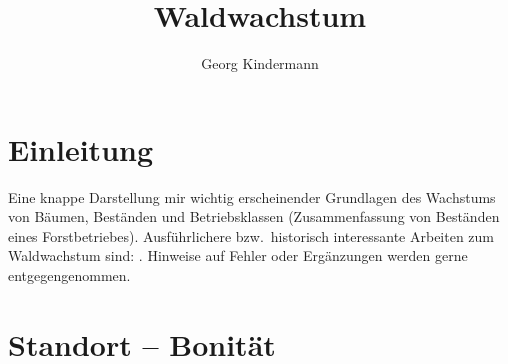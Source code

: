 \documentclass[twocolumn]{scrartcl}
\title{Waldwachstum}
\author{Georg Kindermann}
\begin{document}
\twocolumn[
  \begin{@twocolumnfalse}
    \maketitle
  \end{@twocolumnfalse}
]

\tableofcontents

\section{Einleitung}

Eine knappe Darstellung mir wichtig erscheinender Grundlagen des Wachstums von
Bäumen, Beständen und Betriebsklassen (Zusammenfassung von Beständen eines
Forstbetriebes). Ausführlichere bzw.\ historisch interessante Arbeiten zum
Waldwachstum sind:
\cite{guttenberg1885Wachstumsgesetze,guttenberg1912ZuwachslehreInHandbuchDerForstwissenschaft,vanselow1941Zuwachslehre,weck1948,wiedemann1951Ertragskunde,assmann1961Waldertraskunde,erteld1966Waldertragslehre,mitscherlich1975WaldWachstumUmwelt,kramer1988Waldwachstumslehre,wenk1990Waldertragslehre,Gadow1999Modelling,Gadov2003Waldstruktur,pretzsch2002Grundlagen,Pretzsch2003Modellierung,Vanclay2006,Weiskittel2011,Pretzsch2019}.
Hinweise auf Fehler oder Ergänzungen werden gerne entgegengenommen.

\section{Standort -- Bonität}
\end{document}
